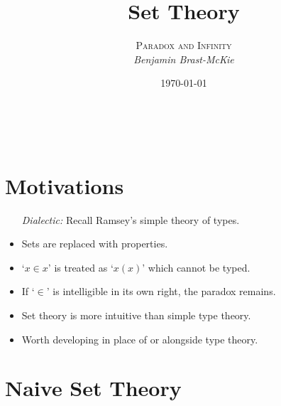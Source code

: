 \documentclass[a4paper, 11pt]{article} %
\title{\textbf{Set Theory}} %
\author{\textsc{Paradox and Infinity}\\ \em Benjamin Brast-McKie} %
\date{\today} %
\makeatletter
\renewcommand{\maketitle}{ %
\begin{flushright} %
{\LARGE\@title} %

\vspace{10pt} %

{\@author} %
\\\@date %

\vspace{-20pt} %
\end{flushright}
}
\makeatother
\begin{document}
\maketitle %

\thispagestyle{empty}




\section*{Motivations}

  \begin{itemize}
    \item[\it Dialectic:] Recall Ramsey's simple theory of types.
      \item Sets are replaced with properties.
      \item `$x \in x$' is treated as `$x(x)$' which cannot be typed.
      \item If `$\in$' is intelligible in its own right, the paradox remains.
      \item Set theory is more intuitive than simple type theory.
      \item Worth developing in place of or alongside type theory.
  \end{itemize}





\section*{Naive Set Theory}
\end{document}
